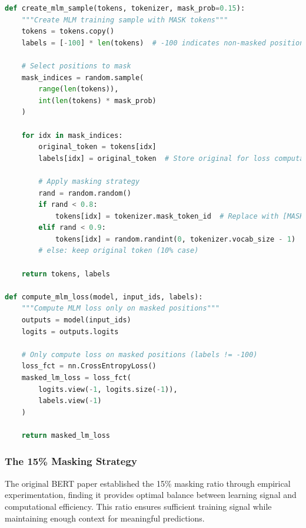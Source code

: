\begin{lstlisting}[language=Python, caption=Basic MLM training procedure]
def create_mlm_sample(tokens, tokenizer, mask_prob=0.15):
    """Create MLM training sample with MASK tokens"""
    tokens = tokens.copy()
    labels = [-100] * len(tokens)  # -100 indicates non-masked positions
    
    # Select positions to mask
    mask_indices = random.sample(
        range(len(tokens)), 
        int(len(tokens) * mask_prob)
    )
    
    for idx in mask_indices:
        original_token = tokens[idx]
        labels[idx] = original_token  # Store original for loss computation
        
        # Apply masking strategy
        rand = random.random()
        if rand < 0.8:
            tokens[idx] = tokenizer.mask_token_id  # Replace with [MASK]
        elif rand < 0.9:
            tokens[idx] = random.randint(0, tokenizer.vocab_size - 1)  # Random token
        # else: keep original token (10% case)
    
    return tokens, labels

def compute_mlm_loss(model, input_ids, labels):
    """Compute MLM loss only on masked positions"""
    outputs = model(input_ids)
    logits = outputs.logits
    
    # Only compute loss on masked positions (labels != -100)
    loss_fct = nn.CrossEntropyLoss()
    masked_lm_loss = loss_fct(
        logits.view(-1, logits.size(-1)), 
        labels.view(-1)
    )
    
    return masked_lm_loss
\end{lstlisting}

\subsubsection{The 15\% Masking Strategy}

The original BERT paper established the 15\% masking ratio through empirical experimentation, finding it provides optimal balance between learning signal and computational efficiency. This ratio ensures sufficient training signal while maintaining enough context for meaningful predictions.

